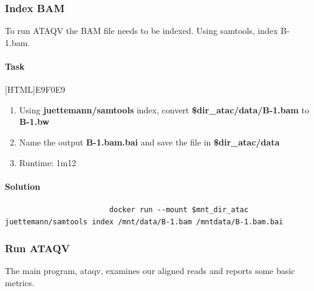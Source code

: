 \documentclass[12pt]{article}
\begin{document}
		\subsubsection{Index BAM}
			To run ATAQV the BAM file needs to be indexed. 
			Using samtools, index B-1.bam.
			
			\paragraph{Task}
			
				[HTML]{E9F0E9}{\parbox{\linewidth}{%
						\begin{enumerate}
							\item  Using \textbf{ juettemann/samtools} index, convert \textbf{\$dir\_atac/data/B-1.bam} to \textbf{B-1.bw}
							\item  Name the output \textbf{B-1.bam.bai} and save the file in \textbf{\$dir\_atac/data}
							\item Runtime: 1m12
						\end{enumerate}
				}}
			
			\paragraph{Solution}
				\begin{minipage}{\linewidth}
					\begin{lstlisting}
						docker run --mount $mnt_dir_atac juettemann/samtools index /mnt/data/B-1.bam /mntdata/B-1.bam.bai
					\end{lstlisting}
				\end{minipage}
		
		\subsubsection{Run ATAQV}
			The main program, ataqv, examines our aligned reads and reports some basic metrics.
			
\end{document}
